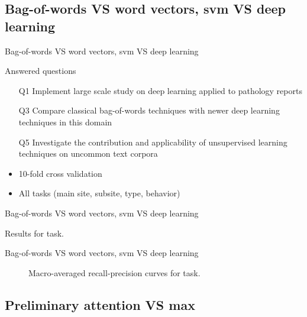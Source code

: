 \subsection{Bag-of-words VS word vectors, \acs{svm} VS deep learning}

\begin{frame}{Bag-of-words VS word vectors, \acs{svm} VS deep learning}
  \begin{block}{Answered questions}
  \begin{itemize}
  \item[Q1] Implement \alert{large scale} study on deep learning
    applied to pathology reports
  \item[Q3] \alert{Compare} classical \alert{bag-of-words} techniques with
    newer deep learning techniques in this domain
  \item[Q5] \alert{Investigate} the contribution and applicability of
    \alert{unsupervised} learning techniques on uncommon text corpora
  \end{itemize}
\end{block}
\begin{itemize}
\item \alert{10-fold} cross validation
\item All tasks (\alert{main} site, \alert{subsite}, \alert{type},
  \alert{behavior})
\end{itemize}
\end{frame}

\begin{frame}{Bag-of-words VS word vectors, \acs{svm} VS deep learning}
\begin{table}
  \centering
  \caption{Results for \site{} task.}
  \footnotesize
  
\end{table}
\end{frame}

\begin{frame}{Bag-of-words VS word vectors, \acs{svm} VS deep learning}
\begin{figure}
  \centering
  \resizebox{0.9\textwidth}{!}{}
  \caption{Macro-averaged recall-precision curves for \site{} task.}
\end{figure}

\end{frame}

\subsection{Preliminary attention VS max}

